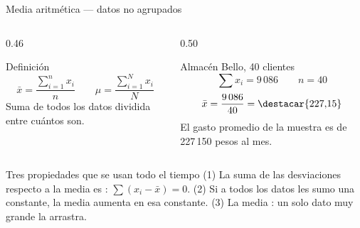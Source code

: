 \documentclass[aspectratio=169,10pt]{beamer}
\begin{document}

\begin{frame}{Media aritmética — datos no agrupados}
  \footnotesize
  \begin{columns}[T,onlytextwidth]
    \begin{column}{0.46\textwidth}
      \begin{block}{Definición}
        \scriptsize
        \[ \bar{x} = \frac{\sum_{i=1}^{n} x_i}{n} \qquad
           \mu = \frac{\sum_{i=1}^{N} x_i}{N} \]
        Suma de todos los datos dividida entre cuántos son.
      \end{block}
    \end{column}
    \begin{column}{0.50\textwidth}
      \begin{exampleblock}{Almacén Bello, 40 clientes}
        \scriptsize
        \[ \sum x_i = 9\,086 \qquad n = 40 \]
        \[ \bar{x} = \frac{9\,086}{40} = \destacar{227{,}15} \]
        El gasto promedio de la muestra es de 227\,150 pesos al mes.
      \end{exampleblock}
    \end{column}
  \end{columns}

  \vspace{0.1cm}
  \begin{alertblock}{Tres propiedades que se usan todo el tiempo}
    \scriptsize
    (1) La suma de las desviaciones respecto a la media es :
    $\sum (x_i - \bar{x}) = 0$. \quad
    (2) Si a todos los datos les sumo una constante, la media aumenta en esa
    constante. \quad
    (3) La media : un solo dato
    muy grande la arrastra.
  \end{alertblock}
\end{frame}
\end{document}
